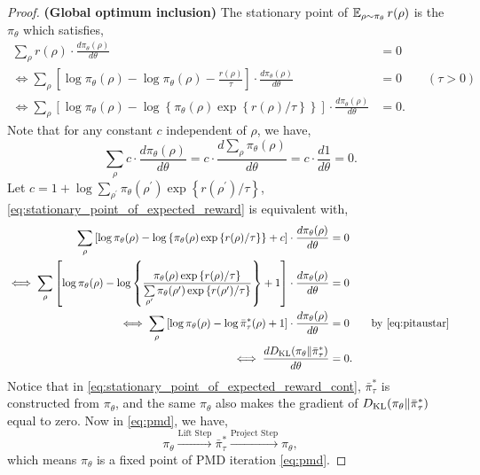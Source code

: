 \begin{proof}
	{\bf (Global optimum inclusion)} The stationary point of $\operatorname{\mathbb{E}}_{\rho \sim \pi_\theta}{  r(\rho)}$ is the $\pi_\theta$ which satisfies,
	\begin{equation}
	\label{eq:stationary_point_of_expected_reward}
	\begin{split}
		\sum\limits_{\rho}{r(\rho) \cdot \frac{d \pi_{\theta}(\rho)}{d \theta}} &= 0 \\
		\iff \sum\limits_{\rho}{ \left[ \log{\pi_\theta(\rho)} - \log{\pi_\theta(\rho)} - \frac{r(\rho)}{\tau} \right] \cdot \frac{d \pi_{\theta}(\rho)}{d \theta}} &= 0 \qquad (\tau > 0) \\
		\iff \sum\limits_{\rho}{ \left[ \log{\pi_\theta(\rho)} - \log\left\{\pi_\theta(\rho) \exp\left\{r(\rho) / \tau\right\} \right\}  \right] \cdot \frac{d \pi_{\theta}(\rho)}{d \theta}} &= 0.
	\end{split}
	\end{equation}
	Note that for any constant $c$ independent of $\rho$, we have,
	\begin{equation*}
		\sum\limits_{\rho}{ c \cdot \frac{d \pi_{\theta}(\rho)}{d \theta} } = c \cdot \frac{d \sum_{\rho}{ \pi_{\theta}(\rho) }}{d \theta} = c \cdot \frac{d 1}{d \theta} = 0.
	\end{equation*}
	Let $c = 1 + \log{ \sum\limits_{\rho^\prime}{\pi_\theta(\rho^\prime) \exp\left\{r(\rho^\prime) / \tau\right\} } }$, \cref{eq:stationary_point_of_expected_reward} is equivalent with,
	\begin{equation}
	\label{eq:stationary_point_of_expected_reward_cont}
	\begin{split}
		\sum\limits_{\rho}{ \left[ \log{\pi_\theta(\rho)} - \log\left\{\pi_\theta(\rho) \exp\left\{r(\rho) / \tau\right\} \right\} + c \right] \cdot \frac{d \pi_{\theta}(\rho)}{d \theta} } &= 0 \\
		\iff \sum\limits_{\rho}{ \left[ \log{\pi_\theta(\rho)} - \log\left\{ \frac{ \pi_\theta(\rho) \exp\left\{r(\rho) / \tau\right\}}{ \sum\limits_{\rho^\prime}{\pi_\theta(\rho^\prime) \exp\left\{r(\rho^\prime) / \tau\right\} } } \right\} + 1 \right] \cdot \frac{d \pi_{\theta}(\rho)}{d \theta} } &= 0 \\
		\iff \sum\limits_{\rho}{ \left[ \log{\pi_\theta(\rho)} - \log{ \bar{\pi}_\tau^*(\rho) } + 1 \right] \cdot \frac{d \pi_{\theta}(\rho)}{d \theta} } &= 0 \qquad \text{by \cref{eq:pitaustar} } \\
		\iff \frac{d \KL( \pi_{\theta} \| \bar{\pi}_\tau^*) }{d \theta} &= 0.
	\end{split}
	\end{equation}
	Notice that in \cref{eq:stationary_point_of_expected_reward_cont}, $\bar{\pi}_\tau^*$ is constructed from $\pi_\theta$, and the same $\pi_\theta$ also makes the gradient of $D_{\mathrm{KL}}( \pi_{\theta} \| \bar{\pi}_\tau^*)$ equal to zero. Now in \cref{eq:pmd}, we have,
	\begin{equation*}
		\pi_\theta \xrightarrow{\text{Lift Step}} \bar{\pi}_\tau^* \xrightarrow{\text{Project Step}} \pi_\theta,
	\end{equation*}
	which means $\pi_{\theta}$ is a fixed point of PMD iteration \cref{eq:pmd}.
\end{proof}


